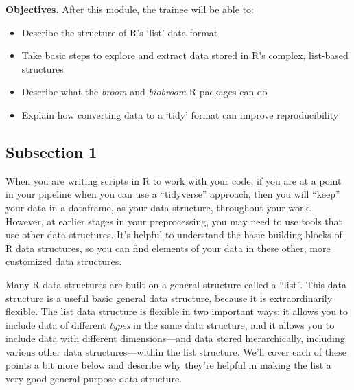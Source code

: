 \documentclass[]{tufte-book}
\providecommand{\tightlist}{%
  \setlength{\itemsep}{0pt}\setlength{\parskip}{0pt}}
\begin{document}
\textbf{Objectives.} After this module, the trainee will be able to:

\begin{itemize}
\tightlist
\item
  Describe the structure of R's `list' data format
\item
  Take basic steps to explore and extract data stored in R's complex, list-based
  structures
\item
  Describe what the \emph{broom} and \emph{biobroom} R packages can do
\item
  Explain how converting data to a `tidy' format can improve reproducibility
\end{itemize}

\hypertarget{subsection-1}{%
\subsection{Subsection 1}\label{subsection-1}}

When you are writing scripts in R to work with your code, if you are at a
point in your pipeline when you can use a ``tidyverse'' approach, then you will
``keep'' your data in a dataframe, as your data structure, throughout your
work. However, at earlier stages in your preprocessing, you may need to use
tools that use other data structures. It's helpful to understand the
basic building blocks of R data structures, so you can find elements of your
data in these other, more customized data structures.

Many R data structures are built on a general structure called a ``list''. This
data structure is a useful basic general data structure, because it is
extraordinarily flexible. The list data structure is flexible in two
important ways: it allows you to include data of different \emph{types} in the
same data structure, and it allows you to include data with different
dimensions---and data stored hierarchically, including various other data
structures---within the list structure. We'll cover each of these points a bit
more below and describe why they're helpful in making the list a very good
general purpose data structure.
\end{document}
